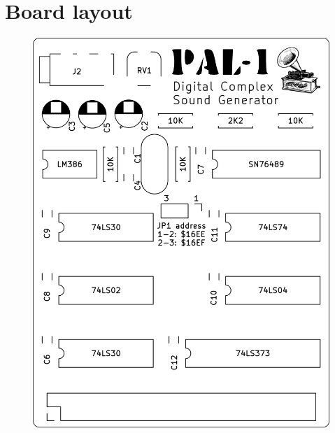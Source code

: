 \documentclass[a4paper,11pt,twoside,openright]{report}
\begin{document}
\chapter{Board layout}
\begin{figure}[h!]
\centering
\includegraphics[scale=0.2]{figures/sound-brd-1.0a.png}
\end{figure}






\end{document}
